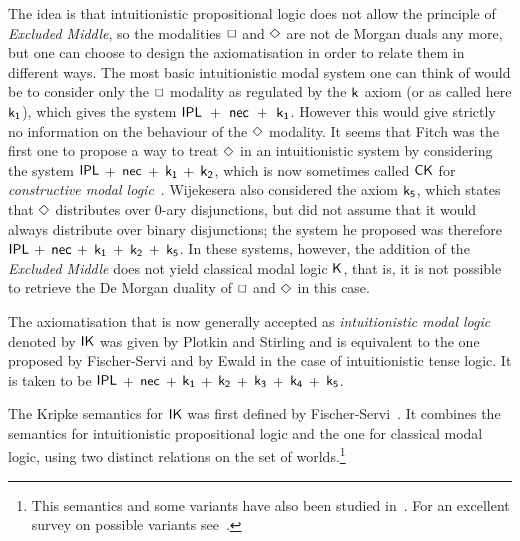 \documentclass[a4paper]{article}
\begin{document}
 The idea is that intuitionistic propositional logic does not allow the principle of \emph{Excluded Middle}, so the modalities $\BOX$ and $\DIA$ are not de Morgan duals any more, but one can choose to design the axiomatisation in order to relate them in different ways. The most basic intuitionistic modal system one can think of would be to consider only the $\BOX$ modality as regulated by the $\kax$ axiom (or as called here $\kax[1]$), which gives the system \hbox{$\rn{IPL}$ $\rn{+}$ $\rn{nec}$ $\rn{+}$ $\kax[1]$}. However this would give strictly no information on the behaviour of the $\DIA$ modality.
 It seems that Fitch \cite{fitch:pm48} was the first one to propose a way to treat $\DIA$ in an intuitionistic system by considering the system  $\rn{IPL}$ $\rn{+}$ $\rn{nec}$ $\rn{+}$ $\kax[1]$ $\rn{+}$ $\kax[2]$, which is now sometimes called $\rn{CK}$ for \emph{constructive modal logic}~\cite{bierman:depaiva:sl00,mendler:scheele:ic11}. Wijekesera \cite{wijesekera:apal90} also considered the axiom $\kax[5]$, which states that $\DIA$ distributes over 0-ary disjunctions, but did not assume that it would always distribute over binary disjunctions; the system he proposed was therefore  $\rn{IPL}$ $\rn{+}$ $\rn{nec}$ $\rn{+}$ $\kax[1]$ $\rn{+}$ $\kax[2]$  $\rn{+}$ $\kax[5]$. In these systems, however, the addition of the \emph{Excluded Middle} does not yield classical modal logic $\K$, that is, it is not possible to retrieve the De Morgan duality of $\BOX$ and $\DIA$ in this case.
 
 The axiomatisation that is now generally accepted as \emph{intuitionistic modal logic} denoted by $\IK$ was given by Plotkin and Stirling \cite{plotkin:stirling:86} and is equivalent to the one proposed by Fischer-Servi \cite{fischer-servi:84} and by Ewald \cite{ewald:jsl86} in the case of intuitionistic tense logic. It is taken to be    $\rn{IPL}$ $\rn{+}$ $\rn{nec}$ $\rn{+}$ $\kax[1]$ $\rn{+}$ $\kax[2]$ $\rn{+}$ $\kax[3]$ $\rn{+}$ $\kax[4]$  $\rn{+}$ $\kax[5]$.
 
 
 The Kripke semantics for $\IK$ was first defined by Fischer-Servi~\cite{fischer-servi:84}.
 It combines the semantics for intuitionistic propositional logic and the one for classical modal logic, using two distinct relations on the set of worlds.\footnote{This semantics and some variants have also been studied in~\cite{bovzic1984models}. For an excellent survey on possible variants see~\cite{simpson:phd}.} 
 
\end{document}
